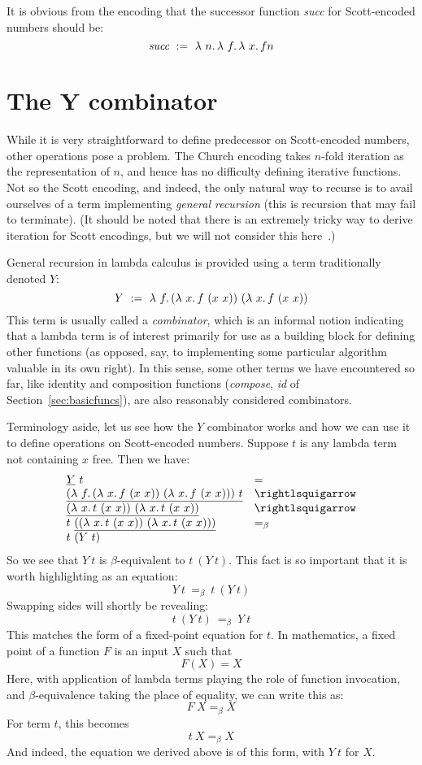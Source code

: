 It is obvious from the encoding that the successor function \textit{succ} for Scott-encoded numbers should be:
\[
\textit{succ}\ := \ \lambda\ n.\, \lambda\ f.\, \lambda\ x.\, f n
\]

\section{The Y combinator}
\label{sec:y}

While it is very straightforward to define predecessor on
Scott-encoded numbers, other operations pose a problem.  The Church
encoding takes $n$-fold iteration as the representation of $n$, and
hence has no difficulty defining iterative functions.  Not so the
Scott encoding, and indeed, the only natural way to recurse is to
avail ourselves of a term implementing \emph{general recursion} (this
is recursion that may fail to terminate).  (It should be noted that
there is an extremely tricky way to derive iteration for Scott encodings, but
we will not consider this here~\cite{lepigre+19}.)

General recursion in lambda calculus is provided using a term traditionally
denoted $Y$:
\[
Y \ :=\ \lam{f}{(\lam{x}{f\ (x\ x)})\ (\lam{x}{f\ (x\ x)})}
\]
\noindent This term is usually called a \emph{combinator}, which is an
informal notion indicating that a lambda term is of interest primarily
for use as a building block for defining other functions (as opposed,
say, to implementing some particular algorithm valuable in its own
right). In this sense, some other terms we have
encountered so far, like identity and composition functions
(\textit{compose}, \textit{id} of Section~\ref{sec:basicfuncs}), are
also reasonably considered combinators.

Terminology aside, let us see how the $Y$ combinator works and how we
can use it to define operations on Scott-encoded numbers.  Suppose $t$ is any
lambda term not containing $x$ free.  Then we have:
\[
\begin{array}{ll}
  \underline{Y}\ t & = \\
  \underline{(\lam{f}{(\lam{x}{f\ (x\ x)})\ (\lam{x}{f\ (x\ x)})})\ t} & \betaa \\
  \underline{(\lam{x}{t\ (x\ x)})\ (\lam{x}{t\ (x\ x)})} & \betaa \\
  t\ \underline{((\lam{x}{t\ (x\ x)})\ (\lam{x}{t\ (x\ x)}))} & =_\beta \\
  t\ (Y\ t)
\end{array}
\]
\noindent So we see that $Y\ t$ is $\beta$-equivalent to $t\ (Y\ t)$.  This fact is so important that
it is worth highlighting as an equation:
\[
Y\ t\ =_\beta \ t\ (Y\ t)
\]
\noindent Swapping sides will shortly be revealing:
\[
t\ (Y\ t)\ =_\beta \ Y\ t
\]
\noindent This matches the form of a fixed-point equation for $t$.  In mathematics, a fixed point of a function $F$ is an input $X$ such that
\[
F(X) = X
\]
\noindent Here, with application of lambda terms playing the role of function invocation, and $\beta$-equivalence taking the place of equality,
we can write this as:
\[
F\ X =_\beta X
\]
\noindent For term $t$, this becomes
\[
t\ X =_\beta X
\]
\noindent And indeed, the equation we derived above is of this form, with $Y\ t$ for $X$.


